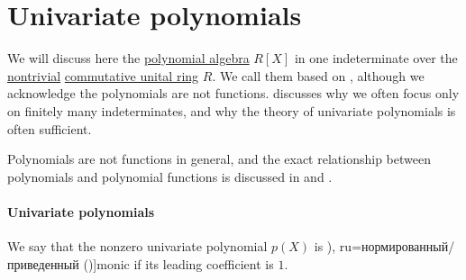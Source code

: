 \section{Univariate polynomials}\label{sec:univariate_polynomials}

We will discuss here the \hyperref[def:polynomial_algebra]{polynomial algebra} \( R[X] \) in one indeterminate over the \hyperref[def:ring/trivial]{nontrivial} \hyperref[def:ring/commutative]{commutative unital ring} \( R \). We call them  based on , although we acknowledge the polynomials are not functions.  discusses why we often focus only on finitely many indeterminates, and why the theory of univariate polynomials is often sufficient.

Polynomials are not functions in general, and the exact relationship between polynomials and polynomial functions is discussed in  and .

\paragraph{Univariate polynomials}

\begin{definition}\label{def:monic_polynomial}
  We say that the nonzero univariate polynomial \( p(X) \) is \term[bg=нормиран (\cite[409]{Обрешков1962ВисшаАлгебра}), ru=нормированный/приведенный (\cite[102]{Винберг2014Алгебра})]{monic} if its leading coefficient is \( 1 \).
\end{definition}

